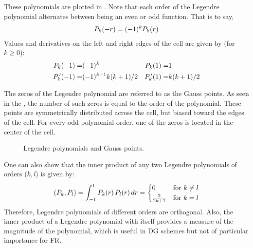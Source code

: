 
These polynomials are plotted in .
%
Note that each order of the Legendre polynomial alternates between
being an even or odd function.
%
That is to say,
\begin{gather}
    \Leg{k}\pvp[-r] = (-1)^k \Leg{k}\pvp[r]
    \label{EQN:LegendreEvenOdd}
\end{gather}
%
Values and derivatives on the left and right edges of the cell are given
by\cite{Huynh_2007} (for $k \geq 0$):
\begin{align}
    \Leg{k}\pvp[-1] =& (-1)^k
 &  \Leg{k}\pvp[ 1] =&   1
 \\
    \dLeg{k}\pvp[-1] =& (-1)^{k-1} k (k+1) / 2
 &  \dLeg{k}\pvp[ 1] =&            k (k+1) / 2
\end{align}


The zeros of the Legendre polynomial are referred to as the Gauss points.
%
As seen in the , the number of such zeros is equal
to the order of the polynomial.
%
These points are symmetrically distributed across the cell, but biased
toward the edges of the cell.
%
For every odd polynomial order, one of the zeros is located in the center
of the cell.


\begin{figure}
  \begin{centering}
    \caption{Legendre polynomials and Gauss points.}
    \label{FIG:LegendrePoly}
  \end{centering}
\end{figure}


One can also show that the inner product of any two Legendre polynomials
of orders ($k,l$) is given by:
\begin{gather}
    (\Leg{k},\Leg{l})
 =  \int_{-1}^{1} \Leg{k}\pvp[r] \Leg{l}\pvp[r] dr
 =  \begin{cases}
        0               &  \text{for $k \neq l$} \\
        \frac{2}{2k+1}  &  \text{for $k = l$}
    \end{cases}
\end{gather}
%
Therefore, Legendre polynomials of different orders are orthogonal.
%
Also, the inner product of a Legendre polynomial with itself provides a
measure of the magnitude of the polynomial, which is useful in DG schemes
but not of particular importance for FR.

